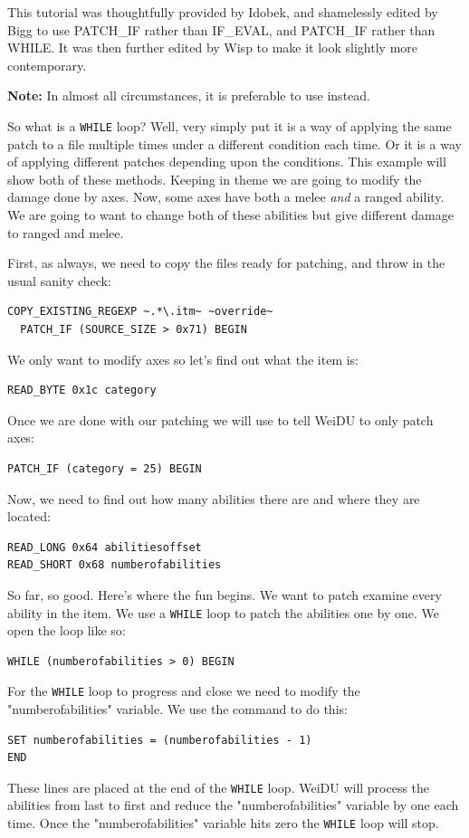 \documentclass{article}
\def\ttref#1{\ahrefloc{#1}{\tt #1}}
\def\t#1{{\tt #1}}
\begin{document}
This tutorial was thoughtfully provided by Idobek, and shamelessly edited
by Bigg to use PATCH_IF rather than IF_EVAL, and PATCH_IF rather than WHILE.
It was then further edited by Wisp to make it look slightly more contemporary.

\textbf{Note:} In almost all circumstances, it is preferable to use \ttref{FOR}
instead.

So what is a \t{WHILE} loop? Well, very simply put it is a way of
applying the same patch to a file multiple times under a different
condition each time. Or it is a way of applying different patches depending
upon the conditions. This example will show both of these methods. Keeping
in theme we are going to modify the damage done by axes. Now, some axes
have both a melee \emph{and} a ranged ability. We are going to want to
change both of these abilities but give different damage to ranged and
melee.


First, as always, we need to copy the files ready for patching, and throw
in the usual sanity check:
\begin{verbatim}
COPY_EXISTING_REGEXP ~.*\.itm~ ~override~
  PATCH_IF (SOURCE_SIZE > 0x71) BEGIN
\end{verbatim}
We only want to modify axes so let's find out what the item is:
\begin{verbatim}
READ_BYTE 0x1c category
\end{verbatim}
Once we are done with our patching we will use \ttref{PATCH_IF} to tell
WeiDU to only patch axes:

\begin{verbatim}
PATCH_IF (category = 25) BEGIN
\end{verbatim}
Now, we need to find out how many abilities there are and where they are
located:
\begin{verbatim}
READ_LONG 0x64 abilitiesoffset
READ_SHORT 0x68 numberofabilities
\end{verbatim}
So far, so good. Here's where the fun begins. We want to patch examine
every ability in the item. We use a \t{WHILE} loop to patch the
abilities one by one. We open the loop like so:
\begin{verbatim}
WHILE (numberofabilities > 0) BEGIN
\end{verbatim}
For the \t{WHILE} loop to progress and close we need to modify the
"numberofabilities" variable. We use the \ttref{SET} command to do this:

\begin{verbatim}
SET numberofabilities = (numberofabilities - 1)
END
\end{verbatim}
These lines are placed at the end of the \t{WHILE} loop. WeiDU will
process the abilities from last to first and reduce the "numberofabilities"
variable by one each time. Once the "numberofabilities" variable hits zero the
\t{WHILE} loop will stop.
\end{document}
